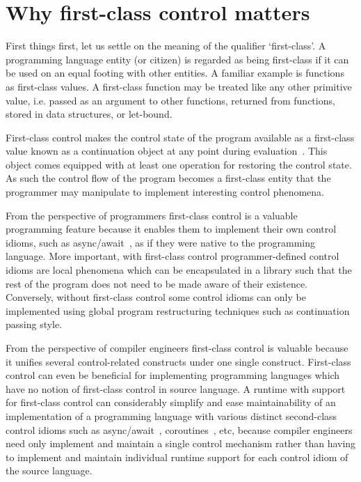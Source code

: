 \documentclass[12pt,phd,lfcs,twoside,openright,logo,leftchapter,normalheadings]{infthesis}
\theoremstyle{plain}
\theoremstyle{definition}
\begin{document}


\section{Why first-class control matters}
First things first, let us settle on the meaning of the qualifier
`first-class'. A programming language entity (or citizen) is regarded
as being first-class if it can be used on an equal footing with other
entities.
%
A familiar example is functions as first-class values. A first-class
function may be treated like any other primitive value, i.e. passed as
an argument to other functions, returned from functions, stored in
data structures, or let-bound.

First-class control makes the control state of the program available
as a first-class value known as a continuation object at any point
during evaluation~\cite{FriedmanHK84}. This object comes equipped with
at least one operation for restoring the control state. As such the
control flow of the program becomes a first-class entity that the
programmer may manipulate to implement interesting control phenomena.

From the perspective of programmers first-class control is a valuable
programming feature because it enables them to implement their own
control idioms, such as async/await~\cite{SymePL11}, as if they were
native to the programming language. More important, with first-class
control programmer-defined control idioms are local phenomena which
can be encapsulated in a library such that the rest of the program
does not need to be made aware of their existence. Conversely, without
first-class control some control idioms can only be implemented using
global program restructuring techniques such as continuation passing
style.

From the perspective of compiler engineers first-class control is
valuable because it unifies several control-related constructs under
one single construct. First-class control can even be beneficial for
implementing programming languages which have no notion of first-class
control in source language. A runtime with support for first-class
control can considerably simplify and ease maintainability of an
implementation of a programming language with various distinct
second-class control idioms such as async/await~\cite{SymePL11},
coroutines~\cite{MouraI09}, etc, because compiler engineers need only
implement and maintain a single control mechanism rather than having
to implement and maintain individual runtime support for each control
idiom of the source language.
\end{document}
